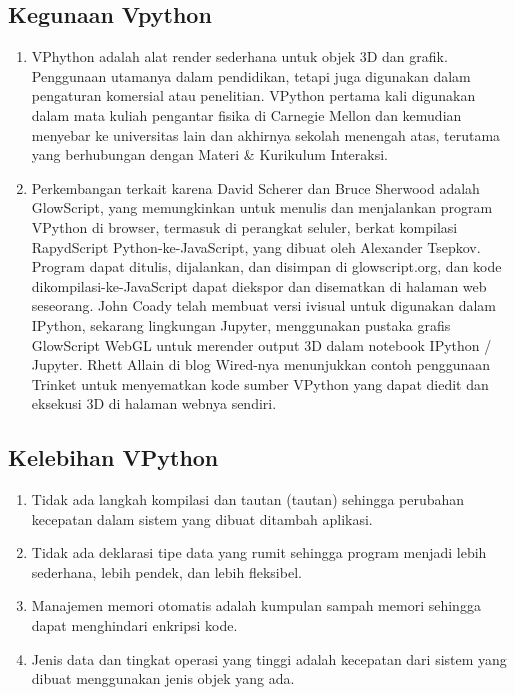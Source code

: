 \subsection{Kegunaan Vpython}
		\begin{enumerate}
			\item VPhython adalah alat render sederhana untuk objek 3D dan grafik. Penggunaan utamanya dalam pendidikan, tetapi juga digunakan dalam pengaturan komersial atau penelitian. VPython pertama kali digunakan dalam mata kuliah pengantar fisika di Carnegie Mellon dan kemudian menyebar ke universitas lain dan akhirnya sekolah menengah atas, terutama yang berhubungan dengan Materi & Kurikulum Interaksi.
			\item Perkembangan terkait karena David Scherer dan Bruce Sherwood adalah GlowScript, yang memungkinkan untuk menulis dan menjalankan program VPython di browser, termasuk di perangkat seluler, berkat kompilasi RapydScript Python-ke-JavaScript, yang dibuat oleh Alexander Tsepkov. Program dapat ditulis, dijalankan, dan disimpan di glowscript.org, dan kode dikompilasi-ke-JavaScript dapat diekspor dan disematkan di halaman web seseorang. John Coady telah membuat versi ivisual untuk digunakan dalam IPython, sekarang lingkungan Jupyter, menggunakan pustaka grafis GlowScript WebGL untuk merender output 3D dalam notebook IPython / Jupyter. Rhett Allain di blog Wired-nya menunjukkan contoh penggunaan Trinket untuk menyematkan kode sumber VPython yang dapat diedit dan eksekusi 3D di halaman webnya sendiri.
		\end{enumerate}
\subsection{Kelebihan VPython}
		\begin{enumerate}
			\item Tidak ada langkah kompilasi dan tautan (tautan) sehingga perubahan kecepatan dalam sistem yang dibuat ditambah aplikasi.
			\item Tidak ada deklarasi tipe data yang rumit sehingga program menjadi lebih sederhana, lebih pendek, dan lebih fleksibel.
			\item Manajemen memori otomatis adalah kumpulan sampah memori sehingga dapat menghindari enkripsi kode.
			\item Jenis data dan tingkat operasi yang tinggi adalah kecepatan dari sistem yang dibuat menggunakan jenis objek yang ada.
		\end{enumerate}
